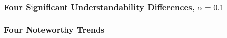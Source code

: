 \begin{frame}
\frametitle{Four Significant Understandability Differences, $\alpha=0.1$}

\end{frame}


\begin{frame}
\frametitle{Four Noteworthy Trends}

\end{frame}

